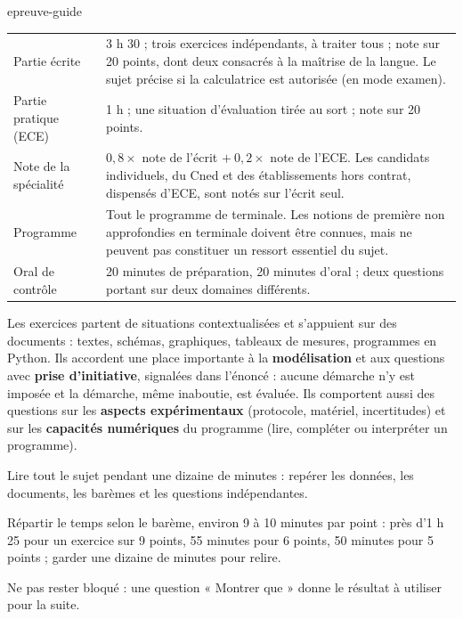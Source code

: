 
\begin{blocEdition}{epreuve-guide}
\fontsize{10}{13.5}\selectfont
{}
\begin{tabularx}{\linewidth}{@{}p{38mm}Y@{}}\toprule
Partie écrite & 3 h 30 ; trois exercices indépendants, à traiter tous ; note sur 20 points, dont deux consacrés à la
maîtrise de la langue. Le sujet précise si la calculatrice est autorisée (en mode examen).\\[1mm]
Partie pratique (ECE) & 1 h ; une situation d'évaluation tirée au sort ; note sur 20 points.\\[1mm]
Note de la spécialité & $0{,}8\times$ note de l'écrit $+\ 0{,}2\times$ note de l'ECE. Les candidats individuels, du Cned et des
établissements hors contrat, dispensés d'ECE, sont notés sur l'écrit seul.\\[1mm]
Programme & Tout le programme de terminale. Les notions de première non approfondies en terminale doivent être connues,
mais ne peuvent pas constituer un ressort essentiel du sujet.\\[1mm]
Oral de contrôle & 20 minutes de préparation, 20 minutes d'oral ; deux questions portant sur deux domaines différents.\\\bottomrule
\end{tabularx}
Les exercices partent de situations contextualisées et s'appuient sur des documents : textes, schémas, graphiques,
tableaux de mesures, programmes en Python. Ils accordent une place importante à la \textbf{modélisation} et aux questions avec
\textbf{prise d'initiative}, signalées dans l'énoncé : aucune démarche n'y est imposée et la démarche, même inaboutie, est
évaluée. Ils comportent aussi des questions sur les \textbf{aspects expérimentaux} (protocole, matériel, incertitudes) et sur
les \textbf{capacités numériques} du programme (lire, compléter ou interpréter un programme).
\begin{questions}
\item Lire tout le sujet pendant une dizaine de minutes : repérer les données, les documents, les barèmes et les questions
indépendantes.
\item Répartir le temps selon le barème, environ 9 à 10 minutes par point : près d'1 h 25 pour un exercice sur 9 points,
55 minutes pour 6 points, 50 minutes pour 5 points ; garder une dizaine de minutes pour relire.
\item Ne pas rester bloqué : une question « Montrer que » donne le résultat à utiliser pour la suite.
\end{questions}
\end{blocEdition}

